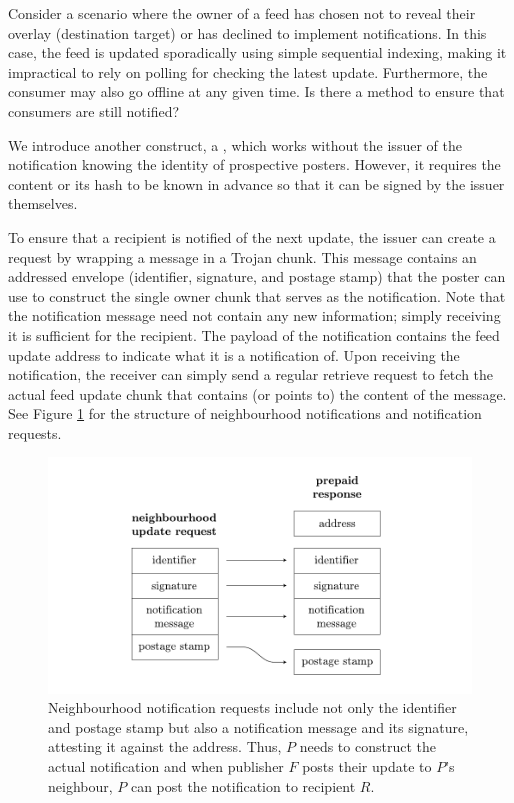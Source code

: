 Consider a scenario where the owner of a feed has chosen not to reveal their overlay (destination target) or has declined to implement notifications. In this case, the feed is updated sporadically using simple sequential indexing, making it impractical to rely on polling for checking the latest update. Furthermore, the consumer may also go offline at any given time.
Is there a method to ensure that consumers are still notified? 

We introduce another construct, a , which works without the issuer of the notification knowing the identity of prospective posters. However, it requires the content or its hash to be known in advance so that it can be signed by the issuer themselves.


To ensure that a recipient is notified of the next update, the issuer can create a  request by wrapping  a message in a Trojan chunk. This message contains an addressed envelope (identifier, signature, and postage stamp) that the poster can use to construct the single owner chunk that serves as the notification. Note that the notification message need not contain any new information; simply receiving it is sufficient for the recipient. The payload of the notification contains the feed update address to indicate what it is a notification of. Upon receiving the notification, the receiver can simply send a regular retrieve request to fetch the actual feed update chunk that contains (or points to) the content of the message. See Figure \ref{fig:notification-from-neighbourhood} for the structure of neighbourhood notifications and notification requests.
                                

\begin{figure}[htbp]
\centering
\includegraphics[width=\textwidth]{fig/notification-from-neighbourhood.pdf}
\caption[Neighbourhood notifications \statusgreen]{Neighbourhood notification requests include not only the identifier and postage stamp but also a notification message and its signature, attesting it against the address. Thus, $P$ needs to construct the actual notification and when publisher $F$ posts their update to $P$'s neighbour, $P$ can post the notification to recipient $R$.}
\label{fig:notification-from-neighbourhood}
\end{figure}

